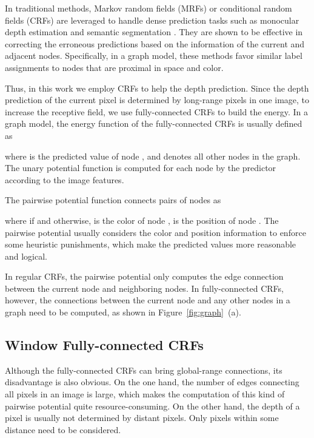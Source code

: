 \documentclass[10pt,twocolumn,letterpaper]{article}
\begin{document}
In traditional methods, Markov random fields (MRFs) or conditional random fields (CRFs) are leveraged to handle dense prediction tasks such as monocular depth estimation \cite{saxena2005learning} and semantic segmentation \cite{chen2017deeplab}. They are shown to be effective in correcting the erroneous predictions based on the information of the current and adjacent nodes. Specifically, in a graph model, these methods favor similar label assignments to nodes that are proximal in space and color.

Thus, in this work we employ CRFs to help the depth prediction. Since the depth prediction of the current pixel is determined by long-range pixels in one image, to increase the receptive field, we use fully-connected CRFs \cite{krahenbuhl2011efficient} to build the energy. In a graph model, the energy function of the fully-connected CRFs is usually defined as 

where  is the predicted value of node , and  denotes all other nodes in the graph. The unary potential function  is computed for each node by the predictor according to the image features.

The pairwise potential function  connects pairs of nodes as

where  if  and  otherwise,  is the color of node ,  is the position of node . The pairwise potential usually considers the color and position information to enforce some heuristic punishments, which make the predicted values  more reasonable and logical.

In regular CRFs, the pairwise potential only computes the edge connection between the current node and neighboring nodes. In fully-connected CRFs, however, the connections between the current node and any other nodes in a graph need to be computed, as shown in Figure~\ref{fig:graph}~(a).

\subsection{Window Fully-connected CRFs}

Although the fully-connected CRFs can bring global-range connections, its disadvantage is also obvious. 
On the one hand, the number of edges connecting all pixels in an image is large, which makes the computation of this kind of pairwise potential quite resource-consuming. 
On the other hand, the depth of a pixel is usually not determined by distant pixels. Only pixels within some distance need to be considered.
\end{document}
